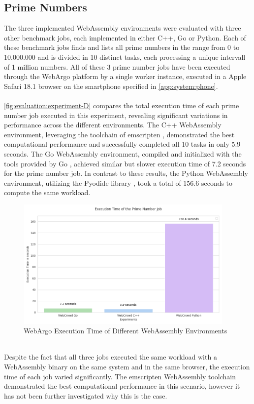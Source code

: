 \subsection{Prime Numbers}
The three implemented WebAssembly environments were evaluated with three other benchmark jobs, each implemented in either C++, Go or Python. Each of these benchmark jobs finds and lists all prime numbers in the range from $0$ to $10.000.000$ and is divided in 10 distinct tasks, each processing a unique intervall of 1 million numbers. All of these 3 prime number jobs have been executed through the WebArgo platform by a single worker instance, executed in a Apple Safari 18.1 \cite{evaluation:safari} browser on the smartphone specified in \autoref{app:system:phone}.
\\~\\
\autoref{fig:evaluation:experiment-D} compares the total execution time of each prime number job executed in this experiment, revealing significant variations in performance across the different environments. The C++ WebAssembly environment, leveraging the toolchain of emscripten \cite{methodology:emcc}, demonstrated the best computational performance and successfully completed all 10 tasks in only 5.9 seconds. The Go WebAssembly environment, compiled and initialized with the tools provided by Go \cite{methodology:go}, achieved similar but slower execution time of 7.2 seconds for the prime number job. In contrast to these results, the Python WebAssembly environment, utilizing the Pyodide library \cite{methodology:pyodie}, took a total of 156.6 seconds to compute the same workload.
\begin{figure}[htbp]
    \centering
    \includegraphics[width=0.95\textwidth]{gfx/figures/Evaluation_D.png}
    \caption{WebArgo Execution Time of Different WebAssembly Environments}
    \label{fig:evaluation:experiment-D}
\end{figure}
~\\
Despite the fact that all three jobs executed the same workload with a WebAssembly binary on the same system and in the same browser, the execution time of each job varied significantly. The emscripten \cite{methodology:emcc} WebAssembly toolchain demonstrated the best computational performance in this scenario, however it has not been further investigated why this is the case.


